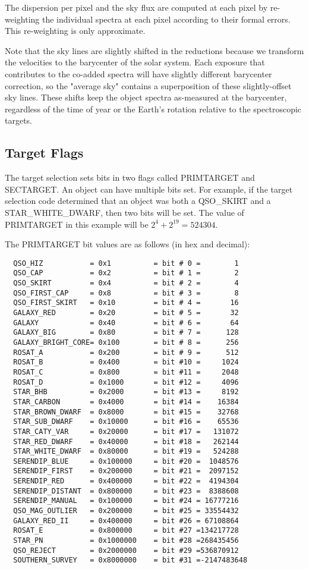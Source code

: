\documentclass[12pt,preprint]{aastex}
\begin{document}
The dispersion per pixel and the sky flux are computed at each pixel
by re-weighting the individual spectra at each pixel according to
their formal errors. This re-weighting is only approximate.

Note that the sky lines are slightly shifted in the reductions
because we transform the velocities to the barycenter of the solar
system. Each exposure that contributes to the co-added spectra will
have slightly different barycenter correction, so the "average sky"
contains a superposition of these slightly-offset sky lines. These
shifts keep the object spectra as-measured at the barycenter,
regardless of the time of year or the Earth's rotation relative to
the spectroscopic targets.

\subsection{Target Flags}

The target selection sets bits in two flags called PRIMTARGET and
SECTARGET. An object can have multiple bits set. For example, if
the target selection code determined that an object was both a
QSO\_SKIRT and a STAR\_WHITE\_DWARF, then two bits will be set. The
value of PRIMTARGET in this example will be $2^4 + 2^{19} = 524304$.

The PRIMTARGET bit values are as follows (in hex and decimal):
\begin{verbatim}
  QSO_HIZ           = 0x1          = bit # 0 =        1
  QSO_CAP           = 0x2          = bit # 1 =        2
  QSO_SKIRT         = 0x4          = bit # 2 =        4
  QSO_FIRST_CAP     = 0x8          = bit # 3 =        8
  QSO_FIRST_SKIRT   = 0x10         = bit # 4 =       16
  GALAXY_RED        = 0x20         = bit # 5 =       32
  GALAXY            = 0x40         = bit # 6 =       64
  GALAXY_BIG        = 0x80         = bit # 7 =      128
  GALAXY_BRIGHT_CORE= 0x100        = bit # 8 =      256
  ROSAT_A           = 0x200        = bit # 9 =      512
  ROSAT_B           = 0x400        = bit #10 =     1024
  ROSAT_C           = 0x800        = bit #11 =     2048
  ROSAT_D           = 0x1000       = bit #12 =     4096
  STAR_BHB          = 0x2000       = bit #13 =     8192
  STAR_CARBON       = 0x4000       = bit #14 =    16384
  STAR_BROWN_DWARF  = 0x8000       = bit #15 =    32768
  STAR_SUB_DWARF    = 0x10000      = bit #16 =    65536
  STAR_CATY_VAR     = 0x20000      = bit #17 =   131072
  STAR_RED_DWARF    = 0x40000      = bit #18 =   262144
  STAR_WHITE_DWARF  = 0x80000      = bit #19 =   524288
  SERENDIP_BLUE     = 0x100000     = bit #20 =  1048576
  SERENDIP_FIRST    = 0x200000     = bit #21 =  2097152
  SERENDIP_RED      = 0x400000     = bit #22 =  4194304
  SERENDIP_DISTANT  = 0x800000     = bit #23 =  8388608
  SERENDIP_MANUAL   = 0x100000     = bit #24 = 16777216
  QSO_MAG_OUTLIER   = 0x200000     = bit #25 = 33554432
  GALAXY_RED_II     = 0x400000     = bit #26 = 67108864
  ROSAT_E           = 0x800000     = bit #27 =134217728
  STAR_PN           = 0x1000000    = bit #28 =268435456
  QSO_REJECT        = 0x2000000    = bit #29 =536870912
  SOUTHERN_SURVEY   = 0x8000000    = bit #31 =-2147483648
\end{verbatim}
\end{document}
